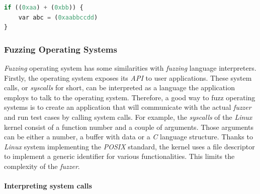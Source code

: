 \begin{minipage}{\linewidth}
\begin{lstlisting}[language=python,caption={Generated program from syntax tree.},label={lst:gensrc}]
if ((0xaa) + (0xbb)) {
    var abc = (0xaabbccdd)
}    
\end{lstlisting}    
\end{minipage}


\subsubsection{Fuzzing Operating Systems}

\textit{Fuzzing} operating system has some similarities with \textit{fuzzing} language interpreters. Firstly, the operating system exposes its \textit{API} to user applications. These system calls, or \textit{syscalls} for short, can be interpreted as a language the application employs to talk to the operating system. Therefore, a good way to fuzz operating systems is to create an application that will communicate with the actual \textit{fuzzer} and run test cases by calling system calls. For example, the \textit{syscalls} of the \textit{Linux} kernel consist of a function number and a couple of arguments. Those arguments can be either a number, a buffer with data or a \textit{C} language structure. Thanks to \textit{Linux} system implementing the \textit{POSIX} standard, the kernel uses a file descriptor to implement a generic identifier for various functionalities. This limits the complexity of the \textit{fuzzer}. 

\paragraph{Interpreting system calls}
 
